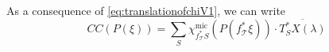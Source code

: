 \documentclass[a4paper, 11pt]{article}
\newcommand{\C}{\mathbb{C}}
\begin{document}

As a consequence of  \eqref{eq:translationofchiV1}, we can write
$$CC(P(\xi)) = \sum_{S}
\chi_{f^{\ast}_{\mathcal{T}}S}^{\mathrm{mic}}(P(f^{\ast}_{\mathcal{T}}\xi))
\cdot \overline{T^{\ast}_{S}X(\lambda)}$$
\end{document}
